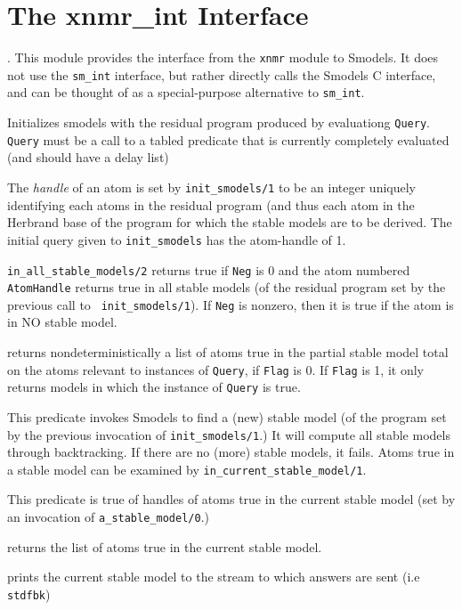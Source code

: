 \section{The xnmr\_int Interface}.
%
This module provides the interface from the {\tt xnmr} module to
Smodels.  It does not use the {\tt sm\_int} interface, but rather
directly calls the Smodels C interface, and can be thought of as a
special-purpose alternative to {\tt sm\_int}.
%
\begin{description}
%
Initializes smodels with the residual program produced by evaluationg
{\tt Query}.  {\tt Query} must be a call to a tabled predicate that is
currently completely evaluated (and should have a delay list)

% 
The {\em handle} of an atom is set by {\tt init\_smodels/1} to be an
integer uniquely identifying each atoms in the residual program (and
thus each atom in the Herbrand base of the program for which the
stable models are to be derived.  The initial query given to
{\tt init\_smodels} has the atom-handle of 1.

%
{\tt in\_all\_stable\_models/2} returns true if {\tt Neg} is 0 and the
atom numbered {\tt AtomHandle} returns true in all stable models (of
the residual program set by the previous call to {\tt
  init\_smodels/1}).  If {\tt Neg} is nonzero, then it is true if the
atom is in NO stable model.

%
returns nondeterministically a list of atoms true in the partial
stable model total on the atoms relevant to instances of {\tt Query},
if {\tt Flag} is 0.  If {\tt Flag} is 1, it only returns models in
which the instance of {\tt Query} is true.

%
This predicate invokes Smodels to find a (new) stable model (of the
program set by the previous invocation of {\tt init\_smodels/1}.)  It
will compute all stable models through backtracking.  If there are no
(more) stable models, it fails.  Atoms true in a stable model can be
examined by {\tt in\_current\_stable\_model/1}.

%
This predicate is true of handles of atoms true in the current stable
model (set by an invocation of {\tt a\_stable\_model/0}.)

%
returns the list of atoms true in the current stable model.

%
prints the current stable model to the stream to which answers are
sent (i.e {\tt stdfbk})

\end{description}
